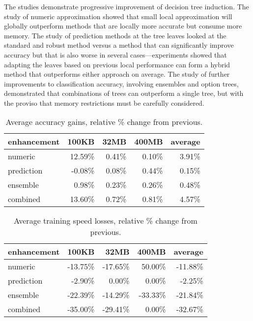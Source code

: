 The studies demonstrate progressive improvement of decision tree induction. The study of numeric approximation showed that small local approximation will globally outperform methods that are locally more accurate but consume more memory. The study of prediction methods at the tree leaves looked at the standard and robust method versus a method that can significantly improve accuracy but that is also worse in several cases---experiments showed that adapting the leaves based on previous local performance can form a hybrid method that outperforms either approach on average. The study of further improvements to classification accuracy, involving ensembles and option trees, demonstrated that combinations of trees can outperform a single tree, but with the proviso that memory restrictions must be carefully considered.

\begin{table}[!t]
\caption{Average accuracy gains, relative \% change from previous.}
\label{tab:accgains}
\centering
\begin{tabular}{|l|r|r|r||r|}
\hline
enhancement	&	100KB	&	32MB	&	400MB	&	average	\\
\hline
numeric	&	12.59\%	&	0.41\%	&	0.10\%	&	3.91\%	\\
prediction	&	-0.08\%	&	0.08\%	&	0.44\%	&	0.15\%	\\
ensemble	&	0.98\%	&	0.23\%	&	0.26\%	&	0.48\%	\\
\hline
\hline
combined	&	13.60\%	&	0.72\%	&	0.81\%	&	4.57\%	\\
\hline
\end{tabular}
\end{table}

\begin{table}[!t]
\caption{Average training speed losses, relative \% change from previous.}
\label{tab:trainspeedlosses}
\centering
\begin{tabular}{|l|r|r|r||r|}
\hline
enhancement	&	100KB	&	32MB	&	400MB	&	average	\\
\hline
numeric	&	-13.75\%	&	-17.65\%	&	50.00\%	&	-11.88\%	\\
prediction	&	-2.90\%	&	0.00\%	&	0.00\%	&	-2.25\%	\\
ensemble	&	-22.39\%	&	-14.29\%	&	-33.33\%	&	-21.84\%	\\
\hline
\hline
combined	&	-35.00\%	&	-29.41\%	&	0.00\%	&	-32.67\%	\\
\hline
\end{tabular}
\end{table}

